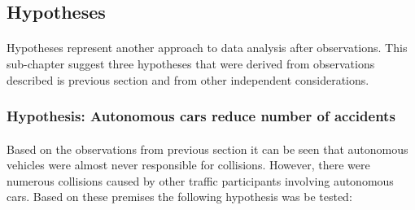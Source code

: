 \documentclass[11pt,english]{article}
\begin{document}


















\subsection{Hypotheses}
\paragraph{}

Hypotheses represent another approach to data analysis after observations. This sub-chapter suggest three hypotheses that were derived from observations described is previous section and from other independent considerations.



\subsubsection{Hypothesis: Autonomous cars reduce number of accidents}
\paragraph{}

Based on the observations from previous section it can be seen that autonomous vehicles were almost never responsible for collisions. However, there were numerous collisions caused by other traffic participants involving autonomous cars. Based on these premises the following hypothesis was be tested:
\end{document}
